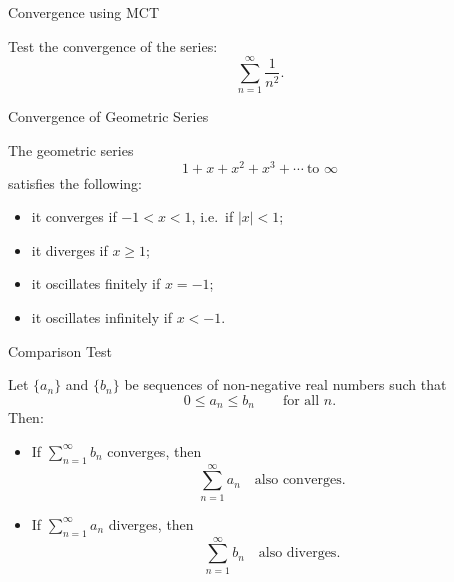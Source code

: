 \documentclass[12pt, a4paper]{article}
\begin{document}
\clearpage

\begin{heading}
	Convergence using MCT
\end{heading}

\vspace{10pt}

\begin{problem}
Test the convergence of the series:
\[
\sum_{n=1}^{\infty} \frac{1}{n^{2}}.
\]
\end{problem}

\clearpage

\begin{heading}
	
\end{heading}

\clearpage

\begin{heading}
	
\end{heading}

\clearpage

\begin{heading}
	Convergence of Geometric Series
\end{heading}

\vspace{10pt}

\begin{theorem}
	The geometric series 
	\[
	1 + x + x^{2} + x^{3} + \cdots \ \text{to } \infty
	\]
	satisfies the following:

	\begin{itemize}
		\item it converges if $-1 < x < 1$, i.e.\ if $|x| < 1$;
		\item it diverges if $x \ge 1$;
		\item it oscillates finitely if $x = -1$;
		\item it oscillates infinitely if $x < -1$.
	\end{itemize}
\end{theorem}

\clearpage

\begin{heading}
	Comparison Test
\end{heading}

\vspace{10pt}

\begin{theorem}
	Let $\{a_n\}$ and $\{b_n\}$ be sequences of non-negative real numbers such that  
	\[
	0 \le a_n \le b_n \qquad \text{for all } n.
	\]
	Then:

	\begin{itemize}
		\item[(i)] If $\displaystyle \sum_{n=1}^{\infty} b_n$ converges, then  
		\[
		\sum_{n=1}^{\infty} a_n \quad \text{also converges}.
		\]

		\item[(ii)] If $\displaystyle \sum_{n=1}^{\infty} a_n$ diverges, then  
		\[
		\sum_{n=1}^{\infty} b_n \quad \text{also diverges}.
		\]
	\end{itemize}
\end{theorem}
\end{document}
